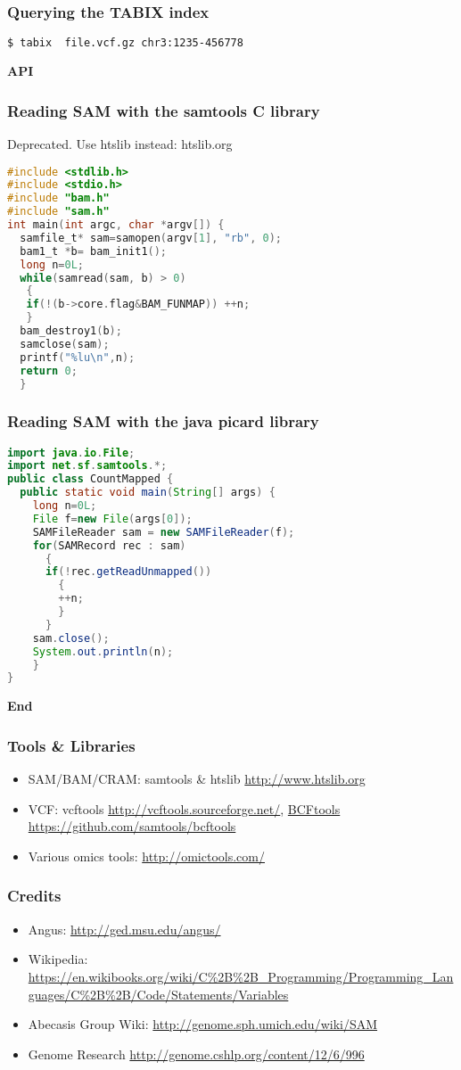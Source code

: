 \documentclass{beamer}
\newcommand{\centeredtitle}[1]{
\begin{center}
    \Huge{\bf{#1}}
\end{center}
}
\newcommand{\hugeslide}[1]{
\begin{frame}
\centeredtitle{#1}
\end{frame}
}
\begin{document}
\begin{frame}[fragile]
\frametitle{Querying the TABIX index}
\begin{lstlisting}[language=bash]
$ tabix  file.vcf.gz chr3:1235-456778
\end{lstlisting}
\end{frame}

\hugeslide{API}

\begin{frame}[fragile]
\frametitle{Reading SAM with the samtools C library}
Deprecated. Use htslib instead: htslib.org
\begin{lstlisting}[language=C]
#include <stdlib.h>
#include <stdio.h>
#include "bam.h"
#include "sam.h"
int main(int argc, char *argv[]) {
  samfile_t* sam=samopen(argv[1], "rb", 0);
  bam1_t *b= bam_init1();
  long n=0L;
  while(samread(sam, b) > 0)
   {
   if(!(b->core.flag&BAM_FUNMAP)) ++n;
   }
  bam_destroy1(b);
  samclose(sam);
  printf("%lu\n",n);
  return 0;
  }
\end{lstlisting}
\end{frame}



\begin{frame}[fragile]
\frametitle{Reading SAM with the java picard library}

\begin{lstlisting}[language=java]
import java.io.File;
import net.sf.samtools.*;
public class CountMapped {
  public static void main(String[] args) {
    long n=0L;
    File f=new File(args[0]);
    SAMFileReader sam = new SAMFileReader(f);
    for(SAMRecord rec : sam)
      {
      if(!rec.getReadUnmapped())
      	{
      	++n;
      	}
      }
    sam.close();
    System.out.println(n);
    }
}
\end{lstlisting}
\end{frame}


\hugeslide{End}


\begin{frame}[fragile]
\frametitle{Tools \& Libraries}
\begin{itemize}
\item SAM/BAM/CRAM: samtools \& htslib \url{http://www.htslib.org}
\item VCF: vcftools \url{http://vcftools.sourceforge.net/}, \url{BCFtools https://github.com/samtools/bcftools}
\item Various omics tools: \url{http://omictools.com/}
\end{itemize}
\end{frame}

\begin{frame}[fragile]
\frametitle{Credits}
\begin{itemize}
\item Angus: \url{http://ged.msu.edu/angus/}
\item Wikipedia: \url{https://en.wikibooks.org/wiki/C%2B%2B_Programming/Programming_Languages/C%2B%2B/Code/Statements/Variables}
\item Abecasis Group Wiki: \url{http://genome.sph.umich.edu/wiki/SAM}
\item Genome Research \url{http://genome.cshlp.org/content/12/6/996}
\end{itemize}
\end{frame}
\end{document}
